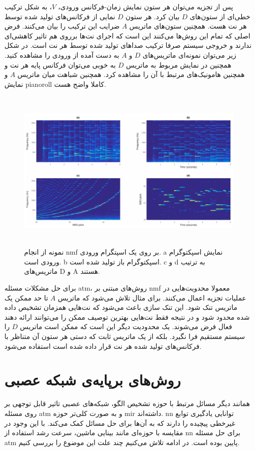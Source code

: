 پس از تجزیه می‌توان هر ستون نمایش زمان-فرکانس ورودی، $V$، به شکل ترکیب خطی‌ای از
ستون‌های $D$ بیان کرد. هر ستون $D$ نمایی از فرکانس‌های تولید شده توسط هر نت هست.
همچنین ستون‌های ماتریس $A$ ضرایب این ترکیب را بیان می‌کنند. فرض اصلی که تمام این
روش‌ها می‌کنند این است که اجرای نت‌ها برروی هم تاثیر کاهشی‌ای ندارند و خروجی
سیستم صرفا ترکیب صداهای تولید شده توسط هر نت است. در شکل زیر می‌توان نمونه‌ای
ماتریس‌های $D$ و $A$ به دست آمده از ورودی را مشاهده کنید. همچنین در نمایش مربوط
به ماتریس $D$ به خوبی می‌توان فرکانس پایه هر نت و همچنین هامونیک‌های مرتبط با آن
را مشاهده کرد. همچنین شباهت میان ماتریس $A$ و نمایش \gls{pianoroll} کاملا واضح
هست.
\begin{figure}
    \centering
    \includegraphics[height=8cm]{./statics/nmf_visualized.png}
    \caption{نمونه از انجام \gls{nmf} بر روی یک اسپتگرام ورودی.
a نمایش اسپکتوگرام ورودی است.
b اسپکتوگرام باز تولید شده است.
c و d به ترتیب ماتریس‌های D و A هستند.}
\end{figure}

برای حل مشکلات مسئله \gls{atm}، روش‌های مبتنی بر \gls{nmf} معمولا محدویت‌هایی در
عملیات تجزیه اعمال می‌کنند. برای مثال تلاش می‌شود که ماتریس $A$ تا حد ممکن یک
ماتریس تنک شود. این تنک سازی باعث می‌شود که نت‌هایی همزمان تشخیص داده شده محدود
شود و در نتیجه فقط نت‌هایی بهترین توصیف ممکن را می‌توانند ارائه دهند فعال فرض
می‌شوند. یک محدودیت دیگر این است که ممکن است ماتریس $D$ را سیستم مستقیم فرا
نگیرد. بلکه از یک ماتریس ثابت که دستی هر ستون آن متناظر با فرکانس‌های تولید شده
هر نت قرار داده شده است استفاده می‌شود.

\section{روش‌های برپایه‌ی شبکه‌ عصبی}
همانند دیگر مسائل مرتبط با حوزه تشخیص الگو، شبکه‌های عصبی تاثیر قابل توجهی بر
روی مسئله \gls{atm} و به صورت کلی‌تر حوزه \gls{mir} داشته‌اند. \gls{nn} توانایی
یادگیری توابع غیرخطی پیچیده‌ را دارند که به آن‌ها برای حل مسائل کمک می‌کند. با
این وجود در مقایسه با حوزه‌ای مانند بینایی ماشین، سرعت رشد استفاده از \gls{nn}
برای حل مسئله \gls{atm} پایین بوده است. در ادامه تلاش می‌کنیم چند علت این موضوع
را بررسی کنیم.


